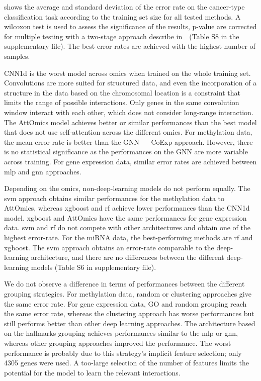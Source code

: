 \documentclass[../main.tex]{subfiles}
\begin{document}
	  shows the average and standard deviation of the error rate on the cancer-type classification task according to the training set size for all tested methods.
	 A wilcoxon test is used to assess the significance of the results, p-value are corrected for multiple testing with a two-stage approach describe in~\cite{10.2307/2346101}~(Table S8 in the supplementary file).
	 The best error rates are achieved with the highest number of samples.

	 CNN1d is the worst model across omics when trained on the whole training set.
	 Convolutions are more suited for structured data, and even the incorporation of a structure in the data based on the chromosomal location is a constraint that limits the range of possible interactions.
	 Only genes in the same convolution window interact with each other, which does not consider long-range interaction.
	 The AttOmics model achieves better or similar performances than the best model that does not use self-attention across the different omics.
	 For methylation data, the mean error rate is better than the GNN --- CoExp approach.
	 However, there is no statistical significance as the performances on the GNN are more variable across training.
	 For gene expression data, similar error rates are achieved between \gls{mlp} and \gls{gnn} approaches.

	 Depending on the omics, non-deep-learning models do not perform equally.
	 The \gls{svm} approach obtains similar performances for the methylation data to AttOmics, whereas \gls{xgboost} and \gls{rf} achieve lower performances than the CNN1d model.
	 \gls{xgboost} and AttOmics have the same performances for gene expression data.
	 \gls{svm} and \gls{rf} do not compete with other architectures and obtain one of the highest error-rate.
	 For the miRNA data, the best-performing methods are \gls{rf} and \gls{xgboost}.
	 The \gls{svm} approach obtains an error-rate comparable to the deep-learning architecture, and there are no differences between the different deep-learning models (Table S6 in supplementary file).

	 We do not observe a difference in terms of performances between the different grouping strategies.
	 For methylation data, random or clustering approaches give the same error rate.
	 For gene expression data, GO and random grouping reach the same error rate, whereas the clustering approach has worse performances but still performs better than other deep learning approaches.
	 The architecture based on the hallmarks grouping achieves performances similar to the \gls{mlp} or \gls{gnn}, whereas other grouping approaches improved the performance.
	 The worst performance is probably due to this strategy's implicit feature selection; only 4305 genes were used.
	 A too-large selection of the number of features limits the potential for the model to learn the relevant interactions.
\end{document}
